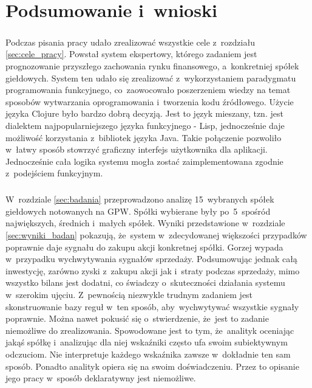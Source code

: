 \chapter{Podsumowanie i~wnioski}\label{chap:podsumowanie}

\paragraph{}
Podczas pisania pracy udało zrealizować wszystkie cele z~rozdziału \ref{sec:cele_pracy}. Powstał system ekspertowy, którego zadaniem jest prognozowanie przyszłego zachowania rynku finansowego, a~konkretniej spółek giełdowych. System ten udało się zrealizować z~wykorzystaniem paradygmatu programowania funkcyjnego, co~zaowocowało poszerzeniem wiedzy na temat sposobów wytwarzania oprogramowania i~tworzenia kodu źródłowego. Użycie języka Clojure\cite{clj} było bardzo dobrą decyzją. Jest to język mieszany, tzn. jest dialektem najpopularniejszego języka funkcyjnego - Lisp, jednocześnie daje możliwość korzystania z~bibliotek języka Java\cite{java}. Takie połączenie pozwoliło w~łatwy sposób stowrzyć graficzny interfejs użytkownika dla aplikacji. Jednocześnie cała logika systemu mogła zostać zaimplementowana zgodnie z~podejściem funkcyjnym.

\paragraph{}
W~rozdziale \ref{sec:badania} przeprowadzono analizę 15~wybranych spółek giełdowych notowanych na GPW. Spółki wybierane były po~5~spośród największych, średnich i~małych spółek. Wyniki przedstawione w~rozdziale \ref{sec:wyniki_badan} pokazują, że~system w~zdecydowanej większości przypadków poprawnie daje sygnału do zakupu akcji konkretnej spółki. Gorzej wypada w~przypadku wychwytywania sygnałów sprzedaży. Podsumowując jednak całą inwestycję, zarówno zyski z~zakupu akcji jak i~straty podczas sprzedaży, mimo wszystko bilans jest dodatni, co świadczy o~skuteczności działania systemu w~szerokim ujęciu. Z~pewnością niezwykle trudnym zadaniem jest skonstruowanie bazy reguł w~ten sposób, aby~wychwytywać wszystkie sygnały poprawnie. Można nawet pokusić się o~stwierdzenie, że~jest to zadanie niemożliwe do zrealizowania. Spowodowane jest to tym, że~analityk oceniając jakąś spółkę i~analizując dla niej wskaźniki często ufa swoim subiektywnym odczuciom. Nie interpretuje każdego wskaźnika zawsze w~dokładnie ten sam sposób. Ponadto analityk opiera się na swoim doświadczeniu. Przez to opisanie jego pracy w~sposób deklaratywny jest niemożliwe.

